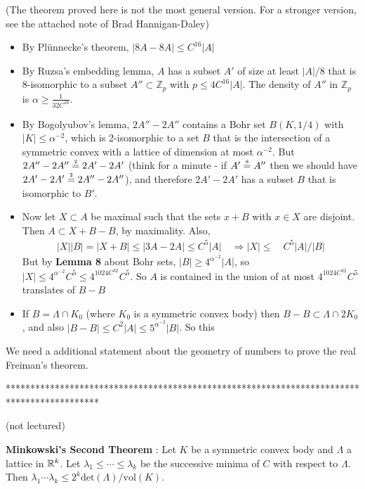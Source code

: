 \documentclass[10pt,a4paper]{report}
\newcommand{\xeq}[1]{\stackrel{\mathclap{\normalfont\mbox{\tiny{#1}}}}{=}}
\begin{document}
(The theorem proved here is not the most general version. For a stronger version, see the attached note of Brad Hannigan-Daley)
\s

\begin{itemize}
\item By Pl\"{u}nnecke's theorem, $|8A - 8A| \leq C^{16}|A|$
\item By Ruzsa's embedding lemma, $A$ has a subset $A'$ of size at least $|A|/8$ that is 8-isomorphic to a subset $A'' \subset\mathbb{Z}_p$ with $p \leq 4C^{16}|A|$. The density of $A''$ in $\mathbb{Z}_p$ is $\alpha \geq \frac{1}{32C^{16}}$.
\item By Bogolyubov's lemma, $2A'' - 2A''$ contains a Bohr set $B(K,1/4)$ with $|K|\leq \alpha^{-2}$, which is 2-isomorphic to a set $B$ that is the intersection of a symmetric convex with a lattice of dimension at most $\alpha^{-2}$. But $2A'' - 2A'' \xeq{2} 2A' -2A'$ (think for a minute - if $A' \xeq{8} A''$ then we should have $2A'-2A' \xeq{2} 2A''-2A''$), and therefore $2A' - 2A'$ has a subset $B$ that is isomorphic to $B'$. 
\item Now let $X \subset A$ be maximal such that the sets $x + B$ with $x\in X$ are disjoint. Then $A \subset X + B-B$, by maximality. Also,
\begin{align*}
|X||B| = |X+B| \leq |3A-2A| \leq C^5 |A| \quad \Rightarrow |X|\leq \quad C^5 |A|/|B|
\end{align*}
But by \textbf{Lemma 8} about Bohr sets, $|B| \geq 4^{\alpha^{-2}} |A|$, so $|X| \leq 4^{\alpha^{-2}}C^5 \leq 4^{1024 C^{32}} C^5$. So $A$ is contained in the union of at most $4^{1024 C^{32}} C^5$ translates of $B-B$
\item If $B = \Lambda \cap K_0$ (where $K_0$ is a symmetric convex body) then $B-B \subset \Lambda \cap 2K_0$, and also $|B-B|\leq C^2 |A| \leq 5^{\alpha^{-2}}|B|$. So this 
\end{itemize}

We need a additional statement about the geometry of numbers to prove the real Freiman's theorem.
\s

*******************************************************************************************

(not lectured)
\s

\textbf{Minkowski's Second Theorem} : Let $K$ be a symmetric convex body and $\Lambda$ a lattice in $\mathbb{R}^k$. Let $\lambda_1 \leq \cdots \leq \lambda_k$ be the successive minima of $C$ with respect to $\Lambda$. Then $\lambda_1 \cdots \lambda_k \leq 2^k \text{det}(\Lambda)/\text{vol}(K)$.
\s
\end{document}
